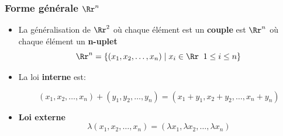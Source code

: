 \documentclass[dvipsnames]{beamer}
\begin{document}
\begin{frame}[<+->]
  \frametitle{Forme générale $\Rr^n$}
  \begin{itemize}
    \small
    \item La généralisation de $\Rr^2$ où chaque élément est un
      \textbf{couple} est \alert{$\Rr^{n}$} où chaque élément un
      \textbf{\alert{n-uplet}} 
      \begin{equation*}
        \Rr^n = \left\{ (x_1,x_2,\ldots, x_n)\;|\; x_i \in \Rr\;\; 1\leq i\leq n \right\}
      \end{equation*}
    \item La loi \textbf{interne} est:

      \begin{equation*}
        (x_1,x_2,\ldots, x_n) + (y_1,y_2,\ldots,y_n) = (x_1 + y_1,
        x_2+y_2,\ldots, x_n+y_n)
      \end{equation*}

    \item \textbf{Loi externe} 
      \begin{equation*}
        \lambda (x_1, x_2,\ldots , x_n)  = (\lambda x_1, \lambda x_2, \ldots,
        \lambda x_n)
      \end{equation*}
  \end{itemize} 
\end{frame}
\end{document}
